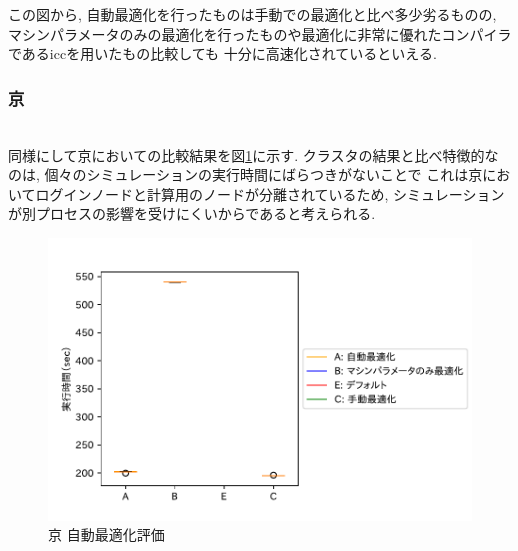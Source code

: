 この図から, 自動最適化を行ったものは手動での最適化と比べ多少劣るものの,
マシンパラメータのみの最適化を行ったものや最適化に非常に優れたコンパイラであるiccを用いたもの比較しても
十分に高速化されているといえる.\\
\subsubsection{京}~\\
同様にして京においての比較結果を図\ref{fig:k-compare}に示す.
クラスタの結果と比べ特徴的なのは, 個々のシミュレーションの実行時間にばらつきがないことで
これは京においてログインノードと計算用のノードが分離されているため, シミュレーションが別プロセスの影響を受けにくいからであると考えられる.\\
\begin{figure}[htb]
 \begin{center}
    \includegraphics[width=14cm]{./images/k-compare.pdf}
    \caption{京 自動最適化評価}
    \label{fig:k-compare}
  \end{center}
\end{figure}~\\

